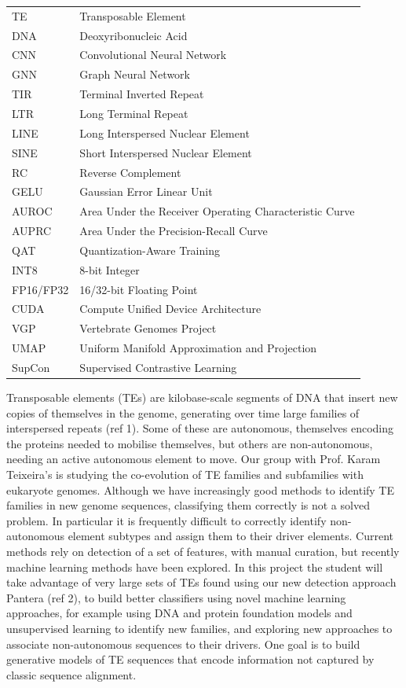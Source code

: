 \documentclass[12pt]{article}
\begin{document}
\begin{tabular}{ll}
    TE & Transposable Element \\
    DNA & Deoxyribonucleic Acid \\
    CNN & Convolutional Neural Network \\
    GNN & Graph Neural Network \\
    TIR & Terminal Inverted Repeat \\
    LTR & Long Terminal Repeat \\
    LINE & Long Interspersed Nuclear Element \\
    SINE & Short Interspersed Nuclear Element \\
    RC & Reverse Complement \\
    GELU & Gaussian Error Linear Unit \\
    AUROC & Area Under the Receiver Operating Characteristic Curve \\
    AUPRC & Area Under the Precision-Recall Curve \\
    QAT & Quantization-Aware Training \\
    INT8 & 8-bit Integer \\
    FP16/FP32 & 16/32-bit Floating Point \\
    CUDA & Compute Unified Device Architecture \\
    VGP & Vertebrate Genomes Project \\
    UMAP & Uniform Manifold Approximation and Projection \\
    SupCon & Supervised Contrastive Learning \\
\end{tabular}

\iffalse


Transposable elements (TEs) are kilobase-scale segments of DNA that insert new copies of themselves in the genome, generating over time large families of interspersed repeats (ref 1). Some of these are autonomous, themselves encoding the proteins needed to mobilise themselves, but others are non-autonomous, needing an active autonomous element to move. Our group with Prof. Karam Teixeira’s is studying the co-evolution of TE families and subfamilies with eukaryote genomes. Although we have increasingly good methods to identify TE families in new genome sequences, classifying them correctly is not a solved problem. In particular it is frequently difficult to correctly identify non-autonomous element subtypes and assign them to their driver elements. Current methods rely on detection of a set of features, with manual curation, but recently machine learning methods have been explored. In this project the student will take advantage of very large sets of TEs found using our new detection approach Pantera (ref 2), to build better classifiers using novel machine learning approaches, for example using DNA and protein foundation models and unsupervised learning to identify new families, and exploring new approaches to associate non-autonomous sequences to their drivers. One goal is to build generative models of TE sequences that encode information not captured by classic sequence alignment.
\end{document}
